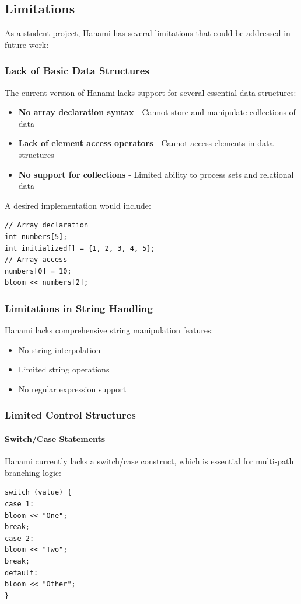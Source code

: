 \documentclass[conference]{IEEEtran}
\begin{document}
\subsection{Limitations}
As a student project, Hanami has several limitations that could be addressed in future work:
\subsubsection{Lack of Basic Data Structures}
The current version of Hanami lacks support for several essential data structures:
\begin{itemize}
\item \textbf{No array declaration syntax} - Cannot store and manipulate collections of data
\item \textbf{Lack of element access operators} - Cannot access elements in data structures
\item \textbf{No support for collections} - Limited ability to process sets and relational data
\end{itemize}
A desired implementation would include:
\begin{verbatim}
// Array declaration
int numbers[5];
int initialized[] = {1, 2, 3, 4, 5};
// Array access
numbers[0] = 10;
bloom << numbers[2];
\end{verbatim}
\subsubsection{Limitations in String Handling}
Hanami lacks comprehensive string manipulation features:
\begin{itemize}
\item No string interpolation
\item Limited string operations
\item No regular expression support
\end{itemize}
\subsubsection{Limited Control Structures}
\paragraph{Switch/Case Statements}
Hanami currently lacks a switch/case construct, which is essential for multi-path branching logic:
\begin{verbatim}
switch (value) {
case 1:
bloom << "One";
break;
case 2:
bloom << "Two";
break;
default:
bloom << "Other";
}
\end{verbatim}
\end{document}
